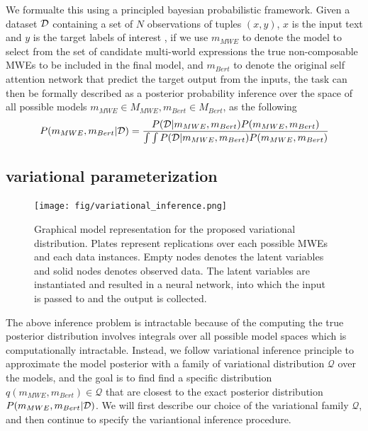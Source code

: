We formualte this using a principled bayesian probabilistic framework. 
Given a dataset $\mathcal{D}$ containing a set of $N$ observations of tuples $(x,y)$,  $x$ is the input text and $y$ is the target labels of interest ,
if we use  $m_{MWE}$ to denote the model to select from the set of candidate multi-world expressions the true non-composable MWEs to be included in the final model, and 
$m_{Bert}$ to denote the original self attention network that predict the target output from the inputs, the task can then be formally described as a posterior probability inference over the space of all possible models $m_{MWE} \in M_{MWE}, m_{Bert} \in M_{Bert}$, as the following
\begin{align*}
\small
\begin{split}
    P(m_{MWE}, m_{Bert} | \mathcalD) = \frac{  P( \mathcalD | m_{MWE}, m_{Bert} ) P(m_{MWE}, m_{Bert})  }{ \int \int P( \mathcalD | m_{MWE}, m_{Bert} ) P(m_{MWE}, m_{Bert}) }\\
\end{split}
\end{align*}


\subsection{variational parameterization}\label{sec:var-param}


\begin{figure}[tb]
    \centering
    \texttt{[image: fig/variational\_inference.png]}
    \vspace{20pt}
    \caption{Graphical model representation for the proposed variational distribution. Plates represent replications over each possible MWEs and each data instances. Empty nodes denotes the latent variables and solid nodes denotes observed data. The latent variables are instantiated and resulted in a neural network, into which the input is passed to and the output is collected. }
    \label{fig:variational}
\end{figure}


The above inference problem is intractable because of the computing the true posterior distribution involves integrals over all possible model spaces which is computationally intractable. 
Instead, we follow  variational inference principle \cite{} to approximate the model posterior with a family of variational distribution $\mathcal{Q}$ over the models, and the goal is to find find a specific distribution $q(m_{MWE}, m_{Bert}) \in \mathcal{Q}$ that are closest to the exact posterior distribution $P(m_{MWE}, m_{Bert} | \mathcal{D})$.
We will first describe our choice of the variational family $\mathcal{Q}$, and then continue to specify the variantional inference procedure.


